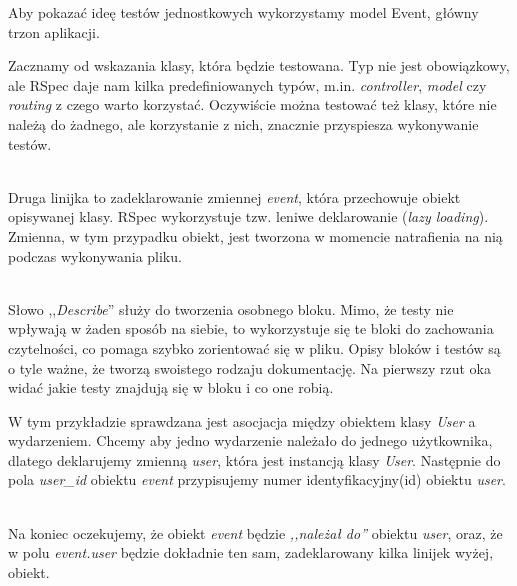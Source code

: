 Aby pokazać ideę testów jednostkowych wykorzystamy model Event, główny trzon aplikacji.

Zacznamy od wskazania klasy, która będzie testowana. Typ nie jest obowiązkowy, ale RSpec daje nam kilka predefiniowanych typów, m.in. \emph{controller}, \emph{model} czy \emph{routing} z czego warto korzystać. Oczywiście można testować też klasy, które nie należą do żadnego, ale korzystanie z nich, znacznie przyspiesza wykonywanie testów.

\begin{code}
	
\end{code}\\

Druga linijka to zadeklarowanie zmiennej \emph{event}, która przechowuje obiekt opisywanej klasy. RSpec wykorzystuje tzw. leniwe deklarowanie (\emph{lazy loading}). Zmienna, w tym przypadku obiekt, jest tworzona w momencie natrafienia na nią podczas wykonywania pliku.

\begin{code}
	
\end{code}\\

Słowo ,,\emph{Describe}'' służy do tworzenia osobnego bloku. Mimo, że testy nie wpływają w żaden sposób na siebie, to wykorzystuje się te bloki do zachowania czytelności, co pomaga szybko zorientować się w pliku. Opisy bloków i testów są o tyle ważne, że tworzą swoistego rodzaju dokumentację. Na pierwszy rzut oka widać jakie testy znajdują się w bloku i co one robią.

W tym przykładzie sprawdzana jest asocjacja między obiektem klasy \emph{User} a wydarzeniem. Chcemy aby jedno wydarzenie należało do jednego użytkownika, dlatego deklarujemy zmienną \emph{user}, która jest instancją klasy \emph{User}. Następnie do pola \emph{user\_id} obiektu \emph{event} przypisujemy numer identyfikacyjny(id) obiektu \emph{user}.

\begin{code}
	
\end{code}\\

Na koniec oczekujemy, że obiekt \emph{event} będzie \emph{,,należał do''} obiektu \emph{user}, oraz, że w polu \emph{event.user} będzie dokładnie ten sam, zadeklarowany kilka linijek wyżej, obiekt.

